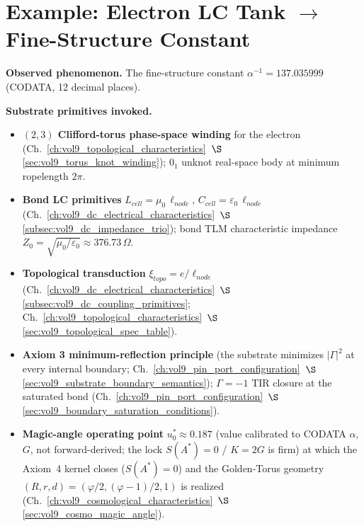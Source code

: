 \section{Example: Electron LC Tank $\to$ Fine-Structure Constant}
\label{sec:vol9_app_electron_lc_alpha}

\textbf{Observed phenomenon.} The fine-structure constant $\alpha^{-1} = 137.035999$ (CODATA, 12 decimal places).

\textbf{Substrate primitives invoked.}

\begin{itemize}
    \item \textbf{$(2,3)$ Clifford-torus phase-space winding} for the electron (Ch.~\ref{ch:vol9_topological_characteristics}~$\S$\ref{sec:vol9_torus_knot_winding}); $0_1$ unknot real-space body at minimum ropelength $2\pi$.
    \item \textbf{Bond LC primitives} $L_{cell} = \mu_0\,\ell_{node}$, $C_{cell} = \varepsilon_0\,\ell_{node}$ (Ch.~\ref{ch:vol9_dc_electrical_characteristics}~$\S$\ref{subsec:vol9_dc_impedance_trio}); bond TLM characteristic impedance $Z_0 = \sqrt{\mu_0/\varepsilon_0} \approx 376.73\,\Omega$.
    \item \textbf{Topological transduction} $\xi_{topo} = e/\ell_{node}$ (Ch.~\ref{ch:vol9_dc_electrical_characteristics}~$\S$\ref{subsec:vol9_dc_coupling_primitives}; Ch.~\ref{ch:vol9_topological_characteristics}~$\S$\ref{sec:vol9_topological_spec_table}).
    \item \textbf{Axiom 3 minimum-reflection principle} (the substrate minimizes $|\Gamma|^2$ at every internal boundary; Ch.~\ref{ch:vol9_pin_port_configuration}~$\S$\ref{sec:vol9_substrate_boundary_semantics}); $\Gamma = -1$\gammaundeclared{} TIR closure at the saturated bond (Ch.~\ref{ch:vol9_pin_port_configuration}~$\S$\ref{sec:vol9_boundary_saturation_conditions}).
    \item \textbf{Magic-angle operating point} $u_0^* \approx 0.187$ (value calibrated to CODATA $\alpha$, $G$, not forward-derived; the lock $S(A^*)=0$ / $K=2G$ is firm) at which the Axiom~4 kernel closes ($S(A^*) = 0$) and the Golden-Torus geometry $(R, r, d) = (\varphi/2, (\varphi-1)/2, 1)$ is realized (Ch.~\ref{ch:vol9_cosmological_characteristics}~$\S$\ref{sec:vol9_cosmo_magic_angle}).
\end{itemize}

